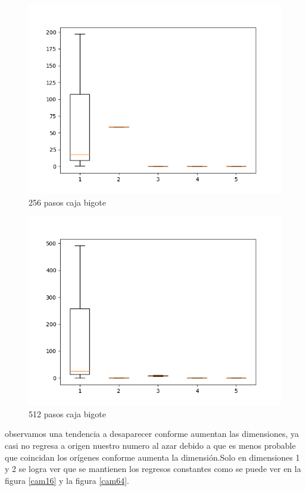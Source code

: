\documentclass[a4paper]{article}
\begin{document}
    \begin{figure}[H]
      \centering                      %
      \includegraphics[scale=.5]{256_pasos.png}   
      \caption{256 pasos caja bigote} 
      \label{cam256}
    \end{figure}

    \begin{figure}[H]
      \centering                      %
      \includegraphics[scale=.5]{512_pasos.png}   
      \caption{512 pasos caja bigote} 
      \label{cam512}
    \end{figure}
observamos una tendencia a desaparecer conforme aumentan las dimensiones, ya casi no regresa a origen nuestro numero al azar debido a que es menos probable que coincidan los orígenes conforme aumenta la dimensión.Solo en dimensiones 1 y 2 se logra ver que se mantienen los regresos constantes como se puede ver en la figura \ref{cam16} y la figura \ref{cam64}.
\end{document}
